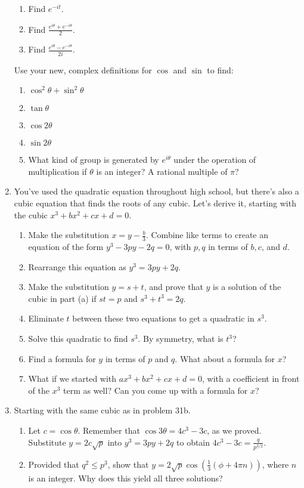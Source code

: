 \documentclass[../gatm.tex]{subfiles}
\begin{document}
\begin{enumerate}
\begin{multicols}{3}
\begin{enumerate}
\item Find $e^{-it}$. 
\item Find $\frac{e^{i\theta} + e^{-i\theta}}{2}$.
\item Find $\frac{e^{i\theta} - e^{-i\theta}}{2i}$.
\setcounter{cg_problem_ii}{\value{enumii}}
\end{enumerate}
\end{multicols}
Use your new, complex definitions for $\cos$ and $\sin$ to find:%
\begin{multicols}{2}
\begin{enumerate}
\setcounter{enumii}{\value{cg_problem_ii}}
\item $\cos^2\theta + \sin^2\theta$
\item $\tan\theta$
\item $\cos 2\theta$
\item $\sin 2\theta$
\item What kind of group is generated by $e^{i\theta}$ under the operation of multiplication if $\theta$ is an integer? A rational multiple of $\pi$?
\end{enumerate}
\end{multicols}
\item You've used the quadratic equation throughout high school, but there's also a cubic equation that finds the roots of any cubic. Let's derive it, starting with the cubic $x^3+bx^2+cx+d=0$.
\begin{enumerate}
\item Make the substitution $x=y-\frac{b}{3}$. Combine like terms to create an equation of the form $y^3-3py-2q=0$, with $p,q$ in terms of $b,c$, and $d$.
\item Rearrange this equation as $y^3=3py+2q$.
\item Make the substitution $y=s+t$, and prove that $y$ is a solution of the cubic in part (a) if $st=p$ and $s^3+t^3=2q$.
\item Eliminate $t$ between these two equations to get a quadratic in $s^3$.
\item Solve this quadratic to find $s^3$. By symmetry, what is $t^3$?
\item Find a formula for $y$ in terms of $p$ and $q$. What about a formula for $x$?
\item What if we started with $ax^3+bx^2+cx+d=0$, with a coefficient in front of the $x^3$ term as well? Can you come up with a formula for $x$?
\end{enumerate}
\item Starting with the same cubic as in problem 31b.
\begin{enumerate}
\item Let $c=\cos\theta$. Remember that $\cos 3\theta=4c^3-3c$, as we proved. Substitute $y=2c\sqrt{p}$ into $y^3=3py+2q$ to obtain $4c^3-3c=\frac{q}{p^{3/2}}$.
\item Provided that $q^2\leq p^3$, show that $y=2\sqrt{p}\cos\left(\frac{1}{3}(\phi+4\pi n)\right)$, where $n$ is an integer. Why does this yield all three solutions?
\end{enumerate}
\end{enumerate}
\end{document}
